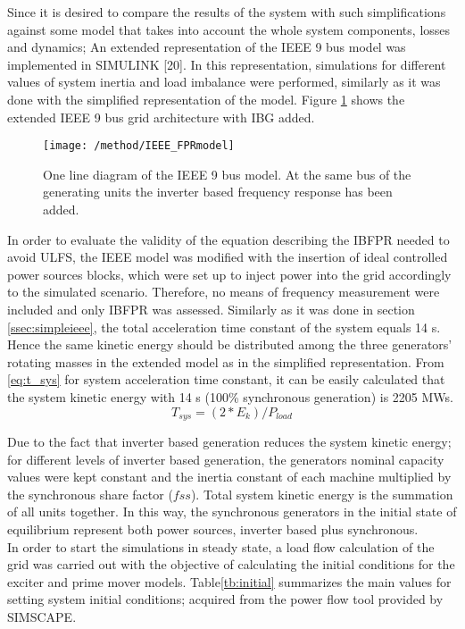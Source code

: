 Since it is desired to compare the results of the system with such simplifications against some model that takes into account the whole system components, losses and dynamics; An  extended representation of the IEEE 9 bus model was implemented in SIMULINK [20]. In this representation, simulations for different values of system inertia and load imbalance were performed, similarly as it was done with the simplified representation of the model. Figure \ref{fig:ieeeext} shows the extended IEEE 9 bus grid architecture with IBG added.
\begin{figure}[h]
	\centering
	\texttt{[image: /method/IEEE\_FPRmodel]}
	\label{fig:ieeeext}
	\caption{One line diagram of the IEEE 9 bus model. At the same bus of the generating units the inverter based frequency response has been added.}
\end{figure}
In order to evaluate the validity of the equation describing the IBFPR needed to avoid ULFS, the IEEE model was modified with the insertion of ideal controlled power sources blocks, which were set up to inject power into the grid accordingly to the simulated scenario. Therefore, no means of frequency measurement were included and only IBFPR was assessed.
Similarly as it was done in section \ref{ssec:simpleieee}, the total acceleration time constant of the system equals 14 s. Hence the same kinetic energy should be distributed among the three generators' rotating masses in the extended model as in the simplified representation. From \eqref{eq:t_sys} for system acceleration time constant, it can be easily calculated that the system kinetic energy with 14 s (100\% synchronous generation) is 2205 MWs.
\begin{equation}
	\label{eq:t_sys}
	T_{sys}=(2*E_{k})/P_{load}
\end{equation}
 
Due to the fact that inverter based generation reduces the system kinetic energy; for different levels of inverter based generation,  the generators nominal capacity values were kept constant and the inertia constant of each machine multiplied by the synchronous share factor ($ fss $). Total system kinetic energy is the summation of all units together. In this way, the synchronous generators in the initial state of equilibrium represent both power sources, inverter based plus synchronous.\\
In order to start the simulations in steady state, a load flow calculation of the grid was carried out with the objective of calculating the initial conditions for the exciter and prime mover models. 
Table\ref{tb:initial} summarizes the main values for setting system initial conditions; acquired from the power flow tool provided by SIMSCAPE.

